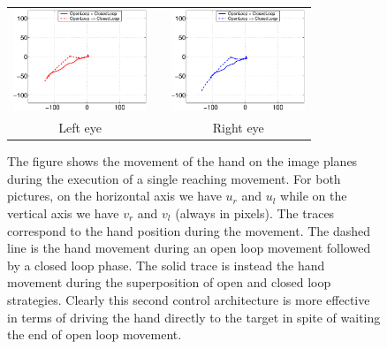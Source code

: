  
  \begin{figure}
  \begin{center}
	\begin{tabular}{ccc}
	  \parbox{40mm}{\includegraphics[width=40mm]{Figure/LeftEyeOpenVSClosedLoop.eps}}  & \hspace{2cm} &
	  \parbox{40mm}{\includegraphics[width=40mm]{Figure/RightEyeOpenVSClosedLoop.eps}}
	  \\
	  \parbox{40mm}{\centering Left eye } & \hspace{2cm} & \parbox{40mm}{\centering Right eye }
  \end{tabular}
\end{center}
\caption{The figure shows the movement of the hand on the image planes 
during the execution of a single reaching movement. For both pictures, 
on the horizontal axis 
we have $u_r$ and $u_l$ while on the vertical axis we have $v_r$ and $v_l$ (always in pixels).
The traces correspond to the hand position during the movement. The dashed line is the hand movement
during an open loop movement followed by a closed loop phase. The solid trace is instead the hand movement during 
the superposition of open and closed loop strategies. Clearly this second control architecture is more effective 
in terms of driving the hand directly to the target in spite of waiting the end of open loop movement.}\label{Fig:TimeResponseOpenVSClosedLoopErrors}
  \end{figure}
  
